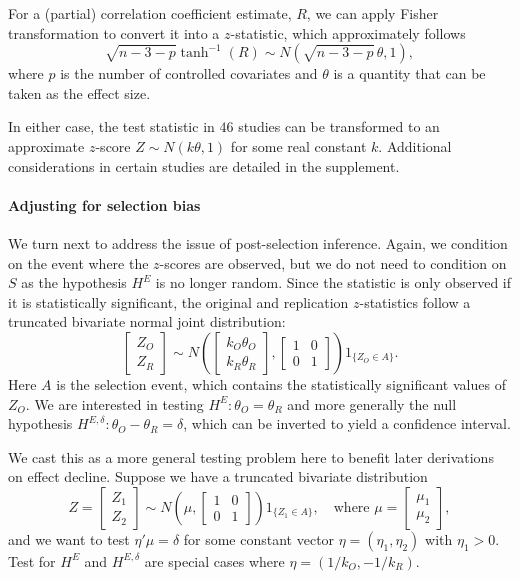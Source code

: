 \documentclass[aoas, preprint]{imsart}
\theoremstyle{definition}
\theoremstyle{custom}
\begin{document}
  For a (partial) correlation coefficient estimate, $R$, we can apply Fisher transformation \citeyearpar{Fisher:1921vq,Fisher:1924ve} to convert it into a $z$-statistic, which approximately follows
  \[
    \sqrt{n-3-p} \tanh^{-1}(R) \sim N(\sqrt{n-3-p}\,\theta, 1),
  \]
  where $p$ is the number of controlled covariates and $\theta$ is a quantity that can be taken as the effect size.

  In either case, the test statistic in $46$ studies can be transformed to an approximate $z$-score $Z \sim N(k \theta, 1)$ for some real constant $k$. Additional considerations in certain studies are detailed in the supplement.

  \paragraph{Adjusting for selection bias} We turn next to address the issue of post-selection inference. Again, we condition on the event where the $z$-scores are observed, but we do not need to condition on $S$ as the hypothesis $H^E$ is no longer random. Since the statistic is only observed if it is statistically significant, the original and replication $z$-statistics follow a truncated bivariate normal joint distribution:
  \[
    \begin{bmatrix}
      Z_O \\ Z_R
    \end{bmatrix} \sim N\left(\begin{bmatrix}
      k_O \theta_O \\ k_R \theta_R
    \end{bmatrix}, \begin{bmatrix}
      1 & 0 \\ 0 & 1
    \end{bmatrix}\right) 1_{\{Z_O \in A\}}.
  \]
  Here $A$ is the selection event, which contains the statistically significant values of $Z_O$. We are interested in testing $H^E: \theta_O = \theta_R$ and more generally the null hypothesis $H^{E,\delta}: \theta_O - \theta_R = \delta$, which can be inverted to yield a confidence interval.

  We cast this as a more general testing problem here to benefit later derivations on effect decline. Suppose we have a truncated bivariate distribution
  \[
    Z = \begin{bmatrix}
      Z_1 \\ Z_2
    \end{bmatrix} \sim N\left(\mu, \begin{bmatrix}
      1 & 0 \\ 0 & 1
    \end{bmatrix}\right) 1_{\{Z_1 \in A\}}, \quad \text{where } \mu = \begin{bmatrix}
      \mu_1 \\ \mu_2
    \end{bmatrix},
  \]
  and we want to test $\eta' \mu = \delta$ for some constant vector $\eta = (\eta_1, \eta_2)$ with $\eta_1 > 0$. Test for $H^E$ and $H^{E,\delta}$ are special cases where $\eta = (1/k_O, -1/k_R)$.
\end{document}
